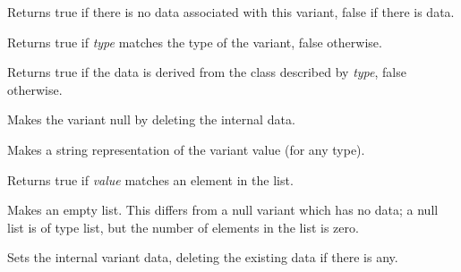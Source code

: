 Returns true if there is no data associated with this variant, false if there is data.

\label{wxvariantistype}


Returns true if {\it type} matches the type of the variant, false otherwise.

\label{wxvariantisvaluekindof}


Returns true if the data is derived from the class described by {\it type}, false otherwise.

\label{wxvariantmakenull}


Makes the variant null by deleting the internal data.

\label{wxvariantmakestring}


Makes a string representation of the variant value (for any type).

\label{wxvariantmember}


Returns true if {\it value} matches an element in the list.

\label{wxvariantnulllist}


Makes an empty list. This differs from a null variant which has no data; a null list
is of type list, but the number of elements in the list is zero.

\label{wxvariantsetdata}


Sets the internal variant data, deleting the existing data if there is any.

\label{wxvariantassignment}



